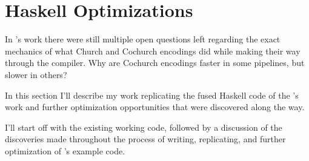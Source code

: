 
\section{Haskell Optimizations}\label{sec:haskell}
In \cite{Harper2011}'s work there were still multiple open questions left regarding the exact mechanics of what Church and Cochurch encodings did while making their way through the compiler. Why are Cochurch encodings faster in some pipelines, but slower in others?

In this section I'll describe my work replicating the fused Haskell code of the \cite{Harper2011}'s work and further optimization opportunities that were discovered along the way.

I'll start off with the existing working code, followed by a discussion of the discoveries made throughout the process of writing, replicating, and further optimization of \cite{Harper2011}'s example code.

